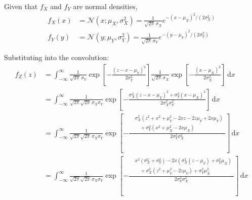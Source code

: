\documentclass{MFM-hw} %
\newcommand{\N}{\mathcal{N}}
\newcommand{\dd}{\,\mathrm{d}}
\begin{document}
Given that $f_X$ and $f_Y$ are normal densities,
\begin{equation*}
\begin{aligned}
f_X(x) &= \N(x; \mu_X, \sigma_X^2) = \frac{1}{\sqrt{2\pi}\,\sigma_X} e^{-(x-\mu_X)^2/(2\sigma_X^2)} \\[5pt]
f_Y(y) &= \N(y; \mu_Y, \sigma_Y^2) = \frac{1}{\sqrt{2\pi}\,\sigma_Y} e^{-(y-\mu_Y)^2/(2\sigma_Y^2)}
\end{aligned}
\end{equation*}

Substituting into the convolution:
\begin{align*}
f_Z(z)
&= \int_{-\infty}^{\infty}
   \frac{1}{\sqrt{2\pi}\,\sigma_Y}
   \exp \left[ -\frac{(z-x-\mu_Y)^2}{2\sigma_Y^2} \right]
   \frac{1}{\sqrt{2\pi}\,\sigma_X}
   \exp \left[ -\frac{(x-\mu_X)^2}{2\sigma_X^2} \right]
   \dd x \\[6pt]
&= \int_{-\infty}^{\infty}
   \frac{1}{\sqrt{2\pi}\sqrt{2\pi}\,\sigma_X \sigma_Y}
   \exp \left[ -\frac{\sigma_X^2 (z-x-\mu_Y)^2 + \sigma_Y^2 (x-\mu_X)^2}{2\sigma_X^2 \sigma_Y^2} \right]
   \dd x \\[6pt]
&= \int_{-\infty}^{\infty}
   \frac{1}{\sqrt{2\pi}\sqrt{2\pi}\,\sigma_X \sigma_Y}
   \exp \left[ -\frac{
      \begin{aligned}
        &\sigma_X^2 \left(z^2 + x^2 + \mu_Y^2 - 2xz - 2z\mu_Y + 2x\mu_Y\right) \\
        &\quad {}+ \sigma_Y^2 \left(x^2 + \mu_X^2 - 2x\mu_X\right)
      \end{aligned}
   }{2\sigma_Y^2 \sigma_X^2} \right]
   \dd x \\[6pt]
&= \int_{-\infty}^{\infty}
   \frac{1}{\sqrt{2\pi}\sqrt{2\pi}\,\sigma_X \sigma_Y}
   \exp \left[ -\frac{
      \begin{aligned}
        &x^2 \left(\sigma_X^2 + \sigma_Y^2\right) -
         2x\left(\sigma_X^2 (z - \mu_Y) + \sigma_Y^2 \mu_X\right) \\
        &\quad {}+ \sigma_X^2 \left(z^2 + \mu_Y^2 - 2z\mu_Y\right) + \sigma_Y^2 \mu_X^2
      \end{aligned}
   }{2\sigma_Y^2 \sigma_X^2} \right]
   \dd x
\end{align*}
\end{document}
